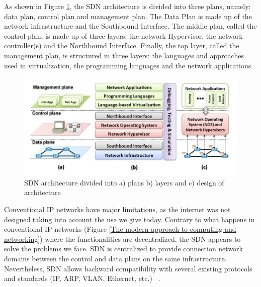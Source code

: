 \documentclass[
  oneside,
  11pt, a4paper,
  footinclude=true,
  headinclude=true,
  cleardoublepage=empty
]{scrbook}
\begin{document}
As shown in Figure \ref{SDN-architecture}, the SDN architecture is divided into three plans, namely: data plan, control plan and management plan. The Data Plan is made up of the network infrastructure and the Southbound Interface. The middle plan, called the control plan, is made up of three layers: the network Hypervisor, the network controller(s) and the Northbound Interface. Finally, the top layer, called the management plan, is structured in three layers: the languages and approaches used in virtualization, the programming languages and the network applications. 

\begin{figure}[H]
\begin{center}
	\includegraphics[width=1\textwidth]{img/arquitetura geral.png}
\end{center}
\caption{SDN architecture divided into a) plans b) layers and c) design
of architecture ~\cite{primeiro}}
\centering
\label{SDN-architecture}
\end{figure}

Conventional IP networks have major limitations, as the internet was not designed taking into account the use we give today. Contrary to what happens in conventional IP networks (Figure \ref{The modern approach to computing and networking})  where the functionalities are decentralized, the SDN appears to solve the problems we face. SDN is centralized to provide connection network domains between the control and data plans on the same infrastructure. Nevertheless, SDN allows backward compatibility with several existing protocols and standards (IP, ARP, VLAN, Ethernet, etc.) ~\cite{primeiro}.\par
\end{document}
